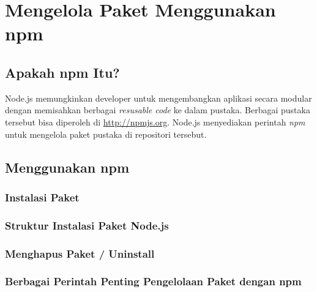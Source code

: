 \chapter{Mengelola Paket Menggunakan npm}

\section{Apakah npm Itu?}

Node.js memungkinkan developer untuk mengembangkan aplikasi secara modular dengan memisahkan berbagai \textit{resusable code} ke dalam pustaka. Berbagai pustaka tersebut bisa diperoleh di \url{http://npmjs.org}. Node.js menyediakan perintah \textit{npm} untuk mengelola paket pustaka di repositori tersebut.

\section{Menggunakan npm}

\subsection{Instalasi Paket}

\subsection{Struktur Instalasi Paket Node.js}

\subsection{Menghapus Paket / Uninstall}

\subsection{Berbagai Perintah Penting Pengelolaan Paket dengan npm}


